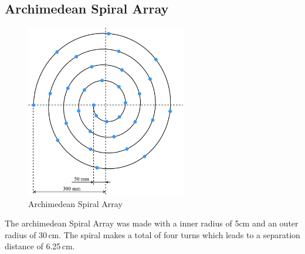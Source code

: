 \subsection{Archimedean Spiral Array}
\begin{minipage}{\linewidth}
	\begin{figure}
		\vspace{-0.8cm}
		\includegraphics[width=7cm]{images/5_array_evaluation/prototype_array_archimedian_spiral.pdf}
		\centering
		\caption{Archimedean Spiral Array}
		\label{fig:prototype_array_archimedian_spiral}
	\end{figure}
	The archimedean Spiral Array was made with a inner radius of 5cm and an outer radius of
	30\,cm. The spiral makes a total of four turns which leads to a
	separation distance of 6.25\,cm.

\end{minipage}
\newpage

